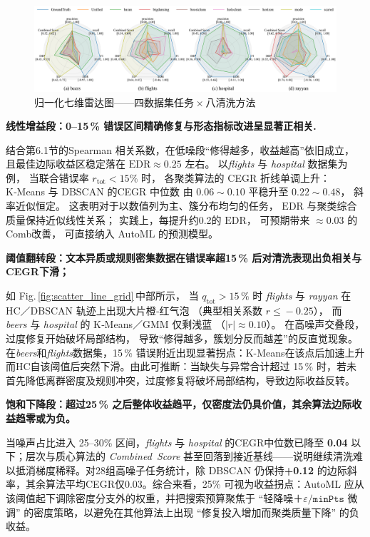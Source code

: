 \documentclass[10pt]{article} %
\numberwithin{equation}{section}
\begin{document}
\begin{figure}[t]
  \centering
  \includegraphics[width=\linewidth]{figures/6.4.3graph/radar_four_in_one.pdf}
  \caption{归一化七维雷达图——四数据集任务 × 八清洗方法}
  \label{fig:radar_four_in_one}
\end{figure}

\medskip
\noindent%
\textbf{线性增益段：0–15\,\% 错误区间精确修复与形态指标改进呈显著正相关.}\;

结合第6.1节的Spearman 相关系数，在低噪段“修得越多，收益越高”依旧成立，
且最佳边际收益区稳定落在 $\mathrm{EDR}\approx0.25$ 左右。
以\textit{flights} 与 \textit{hospital} 数据集为例，
当联合错误率 $r_{\text{tot}}<15\%$ 时，
各聚类算法的 CEGR 折线单调上升：
K‑Means 与 DBSCAN 的\;CEGR 中位数
由 $0.06\!\sim\!0.10$ 平稳升至 $0.22\!\sim\!0.48$，
斜率近似恒定。
\textcolor[rgb]{0.00,0.07,1.00}{这表明对于以数值列为主、簇分布均匀的任务，
$\mathrm{EDR}$ 与聚类综合质量保持近似线性关系；
实践上，每提升约0.2的 $\mathrm{EDR}$，
可预期带来 $\approx0.03$ 的Comb改善，
可直接纳入 AutoML 的预测模型。}

\medskip
\noindent%
\textbf{阈值翻转段：文本异质或规则密集数据在错误率超15\,\% 后对清洗表现出负相关与CEGR下滑；}\;
  
如 Fig.\,\ref{fig:scatter_line_grid}\,中部所示，  
当 $q_{\text{tot}}>15\,\%$ 时  
\textit{flights} 与 \textit{rayyan} 在 HC／DBSCAN 轨迹上出现大片橙‑红气泡  
（典型相关系数 $r\!\le\!-0.25$），  
而 \textit{beers} 与 \textit{hospital} 的 K‑Means／GMM 仅剩浅蓝  
（$|r|\!\approx\!0.10$）。
在高噪声交叠段，过度修复开始破坏局部结构，
导致“修得越多，簇划分反而越差”的反直觉现象。在\textit{beers}和\textit{flights}数据集，15\,\% 错误附近出现显著拐点：K-Means在该点后加速上升而HC自该阈值后突然下滑。由此可推断：\textcolor[rgb]{0.00,0.07,1.00}{当缺失与异常合计超过 15\,\% 时，若未首先降低离群密度及规则冲突，过度修复将破坏局部结构，导致边际收益反转。}

\medskip
\noindent%
\textbf{饱和下降段：超过25\,\% 之后整体收益趋平，仅密度法仍具价值，其余算法边际收益趋零或为负。  }\;

当噪声占比进入 25–30\% 区间，\textit{flights} 与 \textit{hospital} 的CEGR中位数已降至 \textbf{0.04} 以下；层次与质心算法的 \textit{Combined Score} 甚至回落到接近基线——说明继续清洗难以抵消梯度稀释。对28组高噪子任务统计，除 DBSCAN 仍保持\textbf{+0.12} 的边际斜率，其余算法平均CEGR仅0.03。综合来看，25\% 可视为收益拐点：AutoML 应从该阈值起下调除密度分支外的权重，并把搜索预算聚焦于 “轻降噪＋$\varepsilon\!/\texttt{minPts}$ 微调” 的密度策略，以避免在其他算法上出现 “修复投入增加而聚类质量下降” 的负收益。
\end{document}
